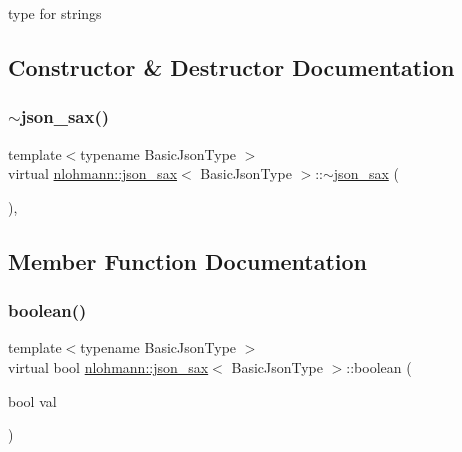 type for strings 



\subsection{Constructor \& Destructor Documentation}
\mbox{\label{structnlohmann_1_1json__sax_af31bacfa81aa7818d8639d1da65c8eb5}} 
\subsubsection{\texorpdfstring{$\sim$json\+\_\+sax()}{~json\_sax()}}
{\footnotesize\ttfamily template$<$typename Basic\+Json\+Type $>$ \\
virtual \hyperlink{structnlohmann_1_1json__sax}{nlohmann\+::json\+\_\+sax}$<$ Basic\+Json\+Type $>$\+::$\sim$\hyperlink{structnlohmann_1_1json__sax}{json\+\_\+sax} (\begin{DoxyParamCaption}{ }\end{DoxyParamCaption})\hspace{0.3cm}{\ttfamily [virtual]}, {\ttfamily [default]}}



\subsection{Member Function Documentation}
\mbox{\label{structnlohmann_1_1json__sax_a82ed080814fa656191a537284bb0c575}} 
\subsubsection{\texorpdfstring{boolean()}{boolean()}}
{\footnotesize\ttfamily template$<$typename Basic\+Json\+Type $>$ \\
virtual bool \hyperlink{structnlohmann_1_1json__sax}{nlohmann\+::json\+\_\+sax}$<$ Basic\+Json\+Type $>$\+::boolean (\begin{DoxyParamCaption}\item[{bool}]{val }\end{DoxyParamCaption})\hspace{0.3cm}{\ttfamily [pure virtual]}}



